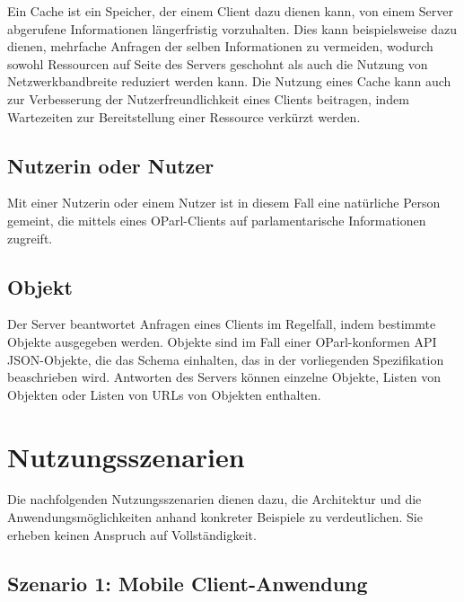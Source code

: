 \documentclass[,a4paper]{article}
\begin{document}

Ein Cache ist ein Speicher, der einem Client dazu dienen kann, von einem
Server abgerufene Informationen längerfristig vorzuhalten. Dies kann
beispielsweise dazu dienen, mehrfache Anfragen der selben Informationen
zu vermeiden, wodurch sowohl Ressourcen auf Seite des Servers geschohnt
als auch die Nutzung von Netzwerkbandbreite reduziert werden kann. Die
Nutzung eines Cache kann auch zur Verbesserung der Nutzerfreundlichkeit
eines Clients beitragen, indem Wartezeiten zur Bereitstellung einer
Ressource verkürzt werden.

\subsection{Nutzerin oder Nutzer}\label{nutzerin}

Mit einer Nutzerin oder einem Nutzer ist in diesem Fall eine natürliche
Person gemeint, die mittels eines OParl-Clients auf parlamentarische
Informationen zugreift.

\subsection{Objekt}\label{objekt}

Der Server beantwortet Anfragen eines Clients im Regelfall, indem
bestimmte Objekte ausgegeben werden. Objekte sind im Fall einer
OParl-konformen API JSON-Objekte, die das Schema einhalten, das in der
vorliegenden Spezifikation beaschrieben wird. Antworten des Servers
können einzelne Objekte, Listen von Objekten oder Listen von URLs von
Objekten enthalten.

\section{Nutzungsszenarien}\label{nutzungsszenarien}

Die nachfolgenden Nutzungsszenarien dienen dazu, die Architektur und die
Anwendungsmöglichkeiten anhand konkreter Beispiele zu verdeutlichen. Sie
erheben keinen Anspruch auf Vollständigkeit.

\subsection{Szenario 1: Mobile
Client-Anwendung}\label{szenarioux5fmobileux5fclient}
\end{document}
